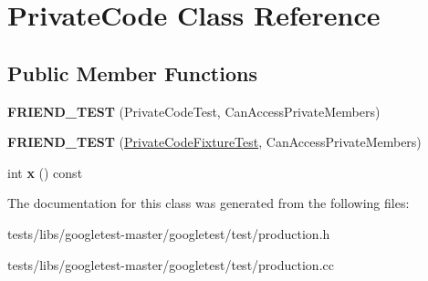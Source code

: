 \hypertarget{classPrivateCode}{}\section{Private\+Code Class Reference}
\label{classPrivateCode}
\subsection*{Public Member Functions}
\begin{DoxyCompactItemize}
\item 
\mbox{\label{classPrivateCode_a9a74a333501232539ab1636f0928d8f2}} 
{\bfseries F\+R\+I\+E\+N\+D\+\_\+\+T\+E\+ST} (Private\+Code\+Test, Can\+Access\+Private\+Members)
\item 
\mbox{\label{classPrivateCode_a29b6823300f68d78691476eeeaed8a7c}} 
{\bfseries F\+R\+I\+E\+N\+D\+\_\+\+T\+E\+ST} (\hyperlink{classtesting_1_1Test}{Private\+Code\+Fixture\+Test}, Can\+Access\+Private\+Members)
\item 
\mbox{\label{classPrivateCode_a247781246ce4d0c66563eaa39ba5aaa9}} 
int {\bfseries x} () const
\end{DoxyCompactItemize}


The documentation for this class was generated from the following files\+:\begin{DoxyCompactItemize}
\item 
tests/libs/googletest-\/master/googletest/test/production.\+h\item 
tests/libs/googletest-\/master/googletest/test/production.\+cc\end{DoxyCompactItemize}
